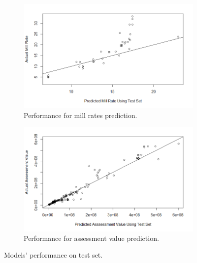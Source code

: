 \documentclass{article}
\begin{document}

\begin{figure}[ht]
\centering
\begin{subfigure}{.5\textwidth}
  \centering
  \includegraphics[width=.9\textwidth]{figures/bagmi.png}
  \caption{Performance for mill rates prediction.}
  \label{fig:5a}
\end{subfigure}%
\begin{subfigure}{.5\textwidth}
  \centering
  \includegraphics[width=.9\textwidth]{figures/bagas.png}
  \caption{Performance for assessment value prediction.}
  \label{fig:5b}
\end{subfigure}
\caption{Models' performance on test set.}
\label{fig:5}
\end{figure}
\FloatBarrier
\end{document}

